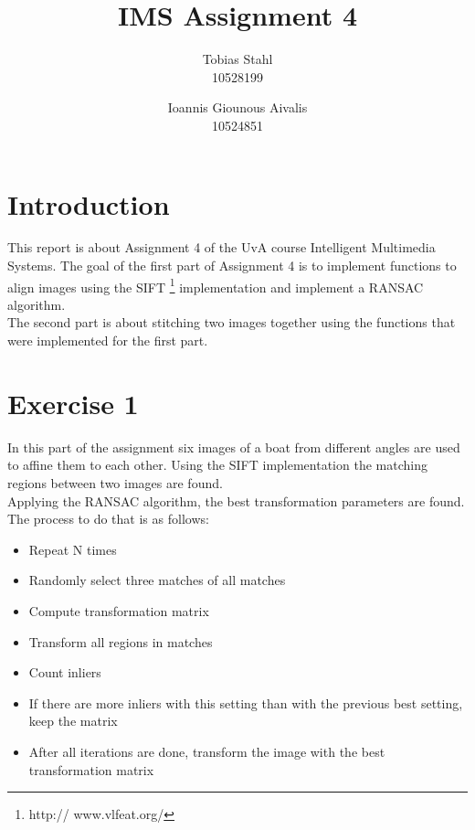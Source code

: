 \documentclass[11pt]{article}
\title{
	\textbf{IMS Assignment 4}
}
\author{Tobias Stahl \\ 10528199 \and Ioannis Giounous Aivalis \\ 10524851 }
\begin{document}
\maketitle

\section{Introduction}
This report is about Assignment 4 of the UvA course Intelligent Multimedia Systems. The goal of the first part of Assignment 4 is to implement functions to align images using the SIFT \footnote{http://
www.vlfeat.org/} implementation and implement a RANSAC algorithm.\\
The second part is about stitching two images together using the functions that were implemented for the first part.

\section{Exercise 1}
In this part of the assignment six images of a boat from different angles are used to affine them to each other. Using the SIFT implementation the matching regions between two images are found.\\
Applying the RANSAC algorithm, the best transformation parameters are found. The process to do that is as follows:

\begin{itemize}
	\item 	Repeat N times
	\item	Randomly select three matches of all matches
	\item	Compute transformation matrix
	\item	Transform all regions in matches
	\item	Count inliers
	\item	If there are more inliers with this setting than with the previous best setting, keep the 			matrix
	\item	After all iterations are done, transform the image with the best transformation matrix
\end{itemize}
\end{document}
